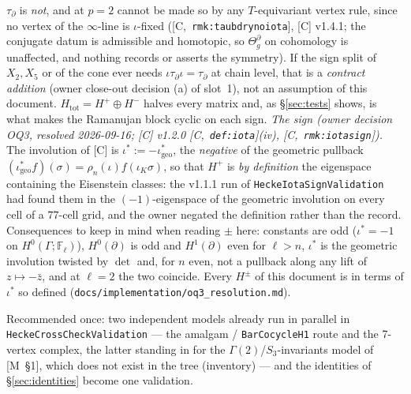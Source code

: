 \documentclass[11pt]{article}
\theoremstyle{remark}
\newcommand{\F}{\mathbb{F}}
\newcommand{\Ga}{\Gamma}
\newcommand{\Htot}{H_{\mathrm{tot}}}
\newcommand{\HA}[1]{[C,~\texttt{#1}]}      %
\newcommand{\Mnote}[1]{[M~\S#1]}            %
\begin{document}
\begin{enumerate}[label=(A\arabic*)]
  $\tau_\partial$ is \emph{not}, and at $p=2$ cannot be made so by any $T$-equivariant vertex
  rule, since no vertex of the $\infty$-line is $\iota$-fixed (\HA{rmk:taubdrynoiota},
  [C] v1.4.1; the conjugate datum is admissible and homotopic, so $\Theta^\partial_g$ on
  cohomology is unaffected, and nothing records or asserts the symmetry). If the sign split of
  $X_2,X_5$ or of the cone ever needs $\iota\tau_\partial\iota=\tau_\partial$ at chain level,
  that is a \emph{contract addition} (owner close-out decision (a) of slot~1), not an
  assumption of this document. $\Htot=H^+\oplus H^-$ halves every
  matrix and, as \S\ref{sec:tests} shows, is what makes the Ramanujan block cyclic on each
  sign. \emph{The sign (owner decision OQ3, resolved 2026-09-16; [C] v1.2.0
  \HA{def:iota}(iv), \HA{rmk:iotasign}).} The involution of [C] is
  $\iota^{\ast}:=-\iota^{\ast}_{\mathrm{geo}}$, the \emph{negative} of the geometric pullback
  $(\iota^{\ast}_{\mathrm{geo}}f)(\sigma)=\rho_n(\iota)f(\iota_K\sigma)$, so that $H^+$ is
  \emph{by definition} the eigenspace containing the Eisenstein classes: the v1.1.1 run of
  \texttt{HeckeIotaSignValidation} had found them in the $(-1)$-eigenspace of the geometric
  involution on every cell of a $77$-cell grid, and the owner negated the definition rather
  than the record. Consequences to keep in mind when reading $\pm$ here: constants are odd
  ($\iota^{\ast}=-1$ on $H^0(\Ga;\F_\ell)$), $H^0(\partial)$ is odd and $H^1(\partial)$ even
  for $\ell>n$, $\iota^{\ast}$ is the geometric involution twisted by $\det$ and, for $n$
  even, not a pullback along any lift of $z\mapsto-\bar z$, and at $\ell=2$ the two coincide. Every
  $H^\pm$ of this document is in terms of $\iota^{\ast}$ so defined
  (\texttt{docs/implementation/oq3\_resolution.md}).
\end{enumerate}
Recommended once: two independent models already run in parallel in
\texttt{HeckeCrossCheckValidation} --- the amalgam / \texttt{BarCocycleH1} route and the 7-vertex
complex, the latter standing in for the $\Ga(2)$/$S_3$-invariants model of \Mnote{1}, which does
not exist in the tree (inventory) --- and the identities of \S\ref{sec:identities} become one
validation.
\end{document}
